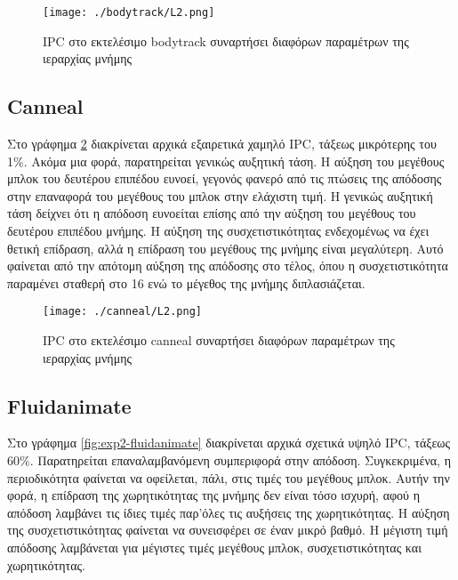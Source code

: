 \documentclass{article}
\newcommand{\eng}[1]{\foreignlanguage{english}{#1}}
\begin{document}
\begin{figure}[h]
    \centering
    \texttt{[image: ./bodytrack/L2.png]} 
    \caption{\eng{IPC} στο εκτελέσιμο \eng{bodytrack} συναρτήσει διαφόρων παραμέτρων της ιεραρχίας μνήμης}
    \label{fig:exp2-bodytrack}
\end{figure}
\FloatBarrier

\clearpage
\subsection{\eng{Canneal}}

Στο γράφημα \ref{fig:exp2-canneal} διακρίνεται αρχικά εξαιρετικά χαμηλό \eng{IPC}, τάξεως μικρότερης του 1\%. Ακόμα μια φορά, παρατηρείται γενικώς αυξητική τάση. Η αύξηση του μεγέθους μπλοκ του δευτέρου επιπέδου ευνοεί, γεγονός φανερό από τις πτώσεις της απόδοσης στην επαναφορά του μεγέθους του μπλοκ στην ελάχιστη τιμή. Η γενικώς αυξητική τάση δείχνει ότι η απόδοση ευνοείται επίσης από την αύξηση του μεγέθους του δευτέρου επιπέδου μνήμης. Η αύξηση της συσχετιστικότητας ενδεχομένως να έχει θετική επίδραση, αλλά η επίδραση του μεγέθους της μνήμης είναι μεγαλύτερη. Αυτό φαίνεται από την απότομη αύξηση της απόδοσης στο τέλος, όπου η συσχετιστικότητα παραμένει σταθερή στο 16 ενώ το μέγεθος της μνήμης διπλασιάζεται. 

\begin{figure}[h]
    \centering
    \texttt{[image: ./canneal/L2.png]} 
    \caption{\eng{IPC} στο εκτελέσιμο \eng{canneal} συναρτήσει διαφόρων παραμέτρων της ιεραρχίας μνήμης}
    \label{fig:exp2-canneal}
\end{figure}
\FloatBarrier

\clearpage
\subsection{\eng{Fluidanimate}}

Στο γράφημα \ref{fig:exp2-fluidanimate} διακρίνεται αρχικά σχετικά υψηλό \eng{IPC}, τάξεως 60\%. Παρατηρείται επαναλαμβανόμενη συμπεριφορά στην απόδοση. Συγκεκριμένα, η περιοδικότητα φαίνεται να οφείλεται, πάλι, στις τιμές του μεγέθους μπλοκ. Αυτήν την φορά, η επίδραση της χωρητικότητας της μνήμης δεν είναι τόσο ισχυρή, αφού η απόδοση λαμβάνει τις ίδιες τιμές παρ'όλες τις αυξήσεις της χωρητικότητας. Η αύξηση της συσχετιστικότητας φαίνεται να συνεισφέρει σε έναν μικρό βαθμό. Η μέγιστη τιμή απόδοσης λαμβάνεται για μέγιστες τιμές μεγέθους μπλοκ, συσχετιστικότητας και χωρητικότητας.
\end{document}
